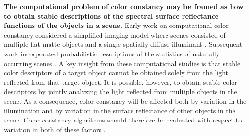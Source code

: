 \documentclass{jov}
\providecommand{\DIFaddtex}[1]{{\bf #1}} %
\providecommand{\DIFdeltex}[1]{} %
\providecommand{\DIFaddbegin}{} %
\providecommand{\DIFaddend}{} %
\providecommand{\DIFdelbegin}{} %
\providecommand{\DIFdelend}{} %
\providecommand{\DIFadd}[1]{\texorpdfstring{\DIFaddtex{#1}}{#1}} %
\providecommand{\DIFdel}[1]{\texorpdfstring{\DIFdeltex{#1}}{}} %
\newcommand{\DIFscaledelfig}{0.5}
\newlength{\DIFdelgraphicswidth} %
\newlength{\DIFdelgraphicsheight} %
\newcommand{\DIFaddincludegraphics}[2][]{{\color{blue}\fbox{\DIFOincludegraphics[#1]{#2}}}} %
\newcommand{\DIFdelincludegraphics}[2][]{%
\sbox{\DIFdelgraphicsbox}{\DIFOincludegraphics[#1]{#2}}%
\settoboxwidth{\DIFdelgraphicswidth}{\DIFdelgraphicsbox} %
\settoboxtotalheight{\DIFdelgraphicsheight}{\DIFdelgraphicsbox} %
\scalebox{\DIFscaledelfig}{%
\parbox[b]{\DIFdelgraphicswidth}{\usebox{\DIFdelgraphicsbox}\\[-\baselineskip] \rule{\DIFdelgraphicswidth}{0em}}\llap{\resizebox{\DIFdelgraphicswidth}{\DIFdelgraphicsheight}{%
\setlength{\unitlength}{\DIFdelgraphicswidth}%
\begin{picture}(1,1)%
\thicklines\linethickness{2pt} %
{\color[rgb]{1,0,0}\put(0,0){\framebox(1,1){}}}%
{\color[rgb]{1,0,0}\put(0,0){\line( 1,1){1}}}%
{\color[rgb]{1,0,0}\put(0,1){\line(1,-1){1}}}%
\end{picture}%
}\hspace*{3pt}}} %
} %
\DeclareRobustCommand{\DIFaddbegin}{\DIFOaddbegin \let\includegraphics\DIFaddincludegraphics} %
\DeclareRobustCommand{\DIFaddend}{\DIFOaddend \let\includegraphics\DIFOincludegraphics} %
\DeclareRobustCommand{\DIFdelbegin}{\DIFOdelbegin \let\includegraphics\DIFdelincludegraphics} %
\DeclareRobustCommand{\DIFdelend}{\DIFOaddend \let\includegraphics\DIFOincludegraphics} %
\begin{document}
\DIFaddbegin \DIFadd{The computational problem of color constancy may be framed as how to obtain stable descriptions of the spectral surface reflectance functions of the objects in a scene.
}\DIFaddend Early work on computational color constancy considered a simplified imaging model where scenes consisted of multiple flat matte objects and a single spatially diffuse illuminant \cite{LandRetinex,Buchsbaum80,MaloneyWandell86}.
Subsequent work incorporated probabilistic descriptions of the statistics of naturally occurring scenes \cite{D'ZmuraConstancy3, D'ZmuraIversonSinger,BrainardFreeman}.
A key insight from these computational studies is that stable color descriptors of a target object cannot be obtained solely from the light reflected from that target object.
It is possible, however, to obtain stable color descriptors by jointly analyzing the light reflected from multiple objects in the scene.
As a consequence, color constancy will be affected both by variation in the illumination and by variation in the surface reflectance of other objects in the scene.  Color constancy algorithms should therefore be evaluated with respect to variation in both of these factors \DIFdelbegin \DIFdel{\cite{BrainardWandellRetinex,BrainardFreeman}}\DIFdelend \DIFaddbegin \DIFadd{\cite{brainard1986analysis,BrainardFreeman}}\DIFaddend . 
\end{document}
